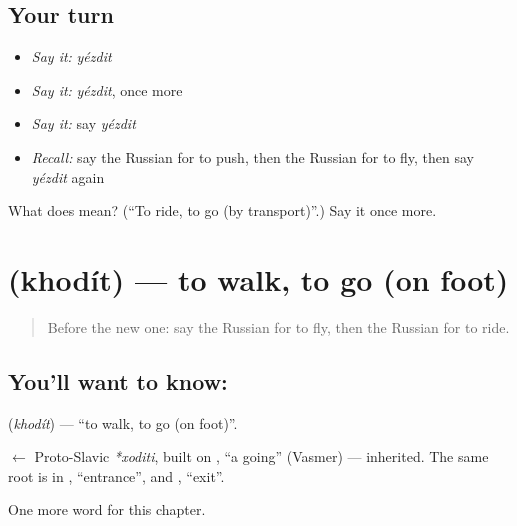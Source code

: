 \subsection*{Your turn}
\begin{itemize}
\raggedright
  \item \emph{Say it:} \emph{yézdit}
  \item \emph{Say it:} \emph{yézdit}, once more
  \item \emph{Say it:} say \emph{yézdit}
  \item \emph{Recall:} say the Russian for to push, then the Russian for to fly, then say \emph{yézdit} again
\end{itemize}

\begin{tcolorbox}[breakable,colback=teal!4,colframe=teal!35!black,title={Before you move on}]
What does  mean? (\textquotedblleft{}To ride, to go (by transport)\textquotedblright{}.) Say it once more.
\end{tcolorbox}
\section[\texorpdfstring{\ru{ходить} (khodít)}{ходить (khodít)}]{ (khodít) — to walk, to go (on foot)}

\label{lesson:RU-C143-khodit}



\begin{quote}
Before the new one: say the Russian for to fly, then the Russian for to ride.
\end{quote}

\subsection*{You'll want to know: }
\textbf{} (\emph{khodít}) — \textquotedblleft{}to walk, to go (on foot)\textquotedblright{}.

\begin{cousinweb}
\textbf{} $\leftarrow$ Proto-Slavic \emph{*xoditi}, built on \emph{}, \textquotedblleft{}a going\textquotedblright{} (Vasmer) — inherited. The same root is in \emph{}, \textquotedblleft{}entrance\textquotedblright{}, and \emph{}, \textquotedblleft{}exit\textquotedblright{}.
\end{cousinweb}

\begin{grammarlens}[title={What you've built}]
One more word for this chapter.
\end{grammarlens}

